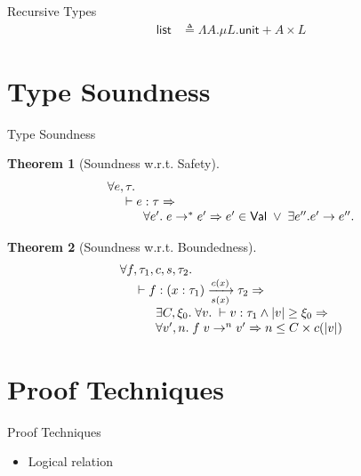 \documentclass{beamer}
\newtheorem{thm}{Theorem}
\newcommand{\arrow}[4]{#1\xrightarrow[#3]{#2}#4}
\newcommand{\symunit}{\mathsf{unit}}
\newcommand{\symlist}{\mathsf{list}}
\newcommand{\defeq}{\triangleq}
\begin{document}
\begin{frame}{Recursive Types}
\begin{align*}
\symlist &\defeq \Lambda A. \mu L. \symunit + A \times L
\end{align*}

\end{frame}

\section{Type Soundness}

\begin{frame}{Type Soundness}

\begin{thm}[Soundness w.r.t. Safety]
$$
\begin{array}{l}
\forall e,\tau. \\
\hspace{0.2in} \vdash e:\tau \Rightarrow \\
\hspace{0.4in} \forall e'.\; e \to^* e' \Rightarrow e'\in\mathsf{Val} \;\vee\; \exists e''. e' \to e''.
\end{array}
$$
\end{thm}

\begin{thm}[Soundness w.r.t. Boundedness]
$$
\begin{array}{l}
\forall f,\tau_1,c,s,\tau_2. \\
\hspace{0.2in} \vdash f:\arrow{(x:\tau_1)}{c(x)}{s(x)}{\tau_2} \Rightarrow \\
\hspace{0.4in} \exists C,\xi_0. \;\forall v.\; \vdash v:\tau_1 \wedge |v| \geq \xi_0 \Rightarrow \\
\hspace{0.4in} \forall v',n.\; f\;v\to^n v' \Rightarrow n\leq C\times c(|v|)
\end{array}
$$
\end{thm}

\end{frame}

\section{Proof Techniques}


\begin{frame}{Proof Techniques}

\begin{itemize}
\item Logical relation
\end{itemize}

\end{frame}
\end{document}
